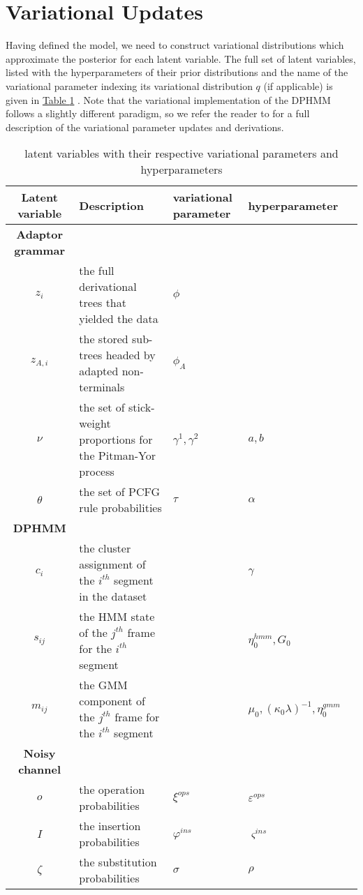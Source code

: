 \documentclass[12pt,letterpaper]{article}
\begin{document}
\section{Variational Updates}
Having defined the model, we need to construct variational distributions which approximate the posterior for each latent variable. The full set of latent variables, listed with the hyperparameters of their prior distributions and the name of the variational parameter indexing its variational distribution $q$ (if applicable) is given in \hyperref[latent]{Table \ref*{latent}} . Note that the variational implementation of the DPHMM follows a slightly different paradigm, so we refer the reader to \citet{ondel:2016} for a full description of the variational parameter updates and derivations. 

\begin{table}
\begin{tabularx}{\textwidth}{|c|X|X|X|X|}
\hline
Latent variable & Description & variational parameter & hyperparameter \\
\hline \hline
\textbf{Adaptor grammar} \\
\hline \hline
$z_i$ & the full derivational trees that yielded the data &  $\phi $ & \\
\hline 
$z_{A,i}$ & the stored sub-trees headed by adapted non-terminals &  $\phi_A$ & \\
\hline
$\nu$& the set of stick-weight proportions for the Pitman-Yor process& $\gamma^1, \gamma^2$ &$a,b$ \\
\hline
$\theta$&  the set of PCFG rule probabilities & $\tau$ & $\alpha$ \\
\hline
\textbf{DPHMM} \\
\hline \hline 
$c_i$ & the cluster assignment of the $i^{th}$ segment in the dataset & &  $\gamma$ \\ 
\hline
$s_{ij}$ & the HMM state of the $j^{th}$ frame for the $i^{th}$ segment & &  $\eta_0^{hmm}, G_0$ \\
\hline
$m_{ij}$ & the GMM component of the $j^{th}$ frame for the $i^{th}$ segment & &   $\mu_0, (\kappa_0\lambda)^{-1}, \eta_0^{gmm}$ \\
\hline
\textbf{Noisy channel}\\
\hline \hline
$o$& the operation probabilities&  $\xi^{ops}$ &  $\varepsilon^{ops}$ \\
\hline
$I$& the insertion probabilities& $\varphi^{ins}$&  $\varsigma^{ins}$\\
\hline 
$\zeta$& the substitution probabilities& $\sigma$  & $\rho $\\
\hline
\end{tabularx}
\caption{latent variables with their respective variational parameters and hyperparameters}
\label{latent}
\end{table}
\end{document}
